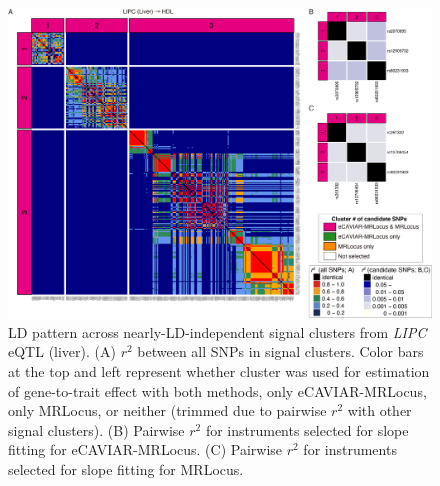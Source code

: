 \documentclass[11pt]{article}
\begin{document}
\begin{figure}[!ht]
  \centering
  \includegraphics[width=\textwidth]{figs/region/heatmap_eQTLbase.Liver_LIPC_HDL.20210114.png}
  \caption{LD pattern across nearly-LD-independent signal clusters
    from \emph{LIPC} eQTL (liver).
    (A) $r^2$ between all SNPs in signal clusters. Color bars at the
    top and left represent whether cluster was used for estimation of
    gene-to-trait effect with both methods, only eCAVIAR-MRLocus, only
    MRLocus, or neither (trimmed due to pairwise $r^2$ with other
    signal clusters). (B) Pairwise $r^2$ for instruments selected for
    slope fitting for eCAVIAR-MRLocus. (C) Pairwise $r^2$ for
    instruments selected for slope fitting for MRLocus.}
\end{figure}
\end{document}
